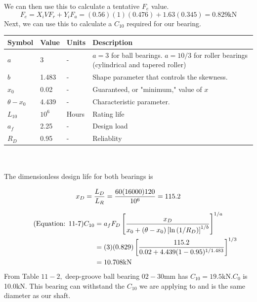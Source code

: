 \documentclass[letterpaper,12pt]{article}
\begin{document}
\noindent We can then use this to calculate a tentative $F_e$ value.
\begin{equation}
F _ { e } = X _ { i } V F _ { r } + Y _ { i } F _ { a } = ( 0.56 ) ( 1 )( 0.476 ) + 1.63 ( 0.345 ) = 0.829 \mathrm{kN} \tag{Equation: 11-2}
\end{equation}
Next, we can use this to calculate a $C_{10}$ required for our bearing.

\begin{tabular}{ |p{1.5cm}||p{1.2cm}|p{2cm}|p{7cm}|  }
		\hline
		Symbol & Value & Units & Description\\
		\hline
		$a$ & 3 & - & $a = 3$ for ball bearings. $a = 10 / 3$ for roller bearings (cylindrical and tapered roller) \\
        $b$ & 1.483 & -  & Shape parameter that controls the skewness.\\			
	    $x_0$ & 0.02 & -  & Guaranteed, or "minimum," value of $x$\\
	    $\theta - x _ { 0 }$ & 4.439 & -  & Characteristic parameter.\\
	    $L _ { 10 }$ & $10^{6}$ & Hours  & Rating life\\
	    $a _ { f }$ & 2.25 & -  & Design load\\
	    $R _ { D }$ & 0.95 & -  & Reliablity\\

	    \hline
\end{tabular}\\ \\
%

The dimensionless design life for both bearings is

\begin{equation}
x _ { D } = \frac { L _ { D } } { L _ { R } } = \frac { 60 ( 16000 ) 120 } { 10 ^ { 6 } } = 115.2 \notag
\end{equation}

\begin{align}
    \tag{Equation: 11-7}
   C _ { 10 } &= a _ { f } F _ { D } \left[ \frac { x _ { D } } { x _ { 0 } + \left( \theta - x _ { 0 } \right) \left[ \ln \left( 1 / R _ { D } \right) \right] ^ { 1 / b } } \right] ^ { 1 / a }\\ \notag
   &= ( 3 ) ( 0.829 ) \left[ \frac { 115.2 } { 0.02 + 4.439 ( 1 - 0.95 ) ^ { 1 / 1.483 } } \right] ^ { 1 / 3 }\\ \notag
   &= 10.708 \mathrm { kN } 
\end{align}
\noindent From Table $11 - 2 ,$ deep-groove ball bearing $02 - 30 \mathrm { mm }$ has $C _ { 10 } = 19.5 \mathrm { kN } . C _ { 0 }$ is 10.0$\mathrm { kN }$. This bearing can withstand the $C_{10}$ we are applying to and is the same diameter as our shaft. \\
\end{document}
